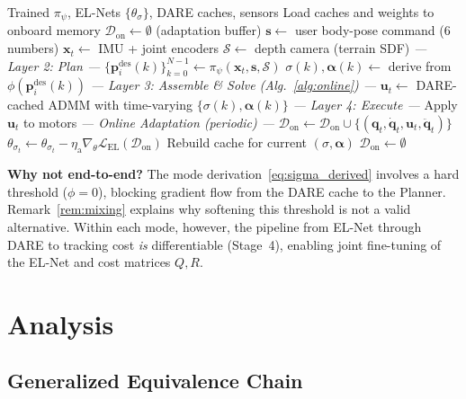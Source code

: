 \documentclass[letterpaper, 10pt, conference]{IEEEtran}
\newcommand{\balpha}{\bm{\alpha}}
\newcommand{\bx}{\bm{x}}
\newcommand{\bu}{\bm{u}}
\newcommand{\bq}{\bm{q}}
\newcommand{\bp}{\bm{p}}
\newcommand{\cS}{\mathcal{S}}
\begin{document}
\begin{algorithm}[t]
\caption{Online Deployment (Real Robot)}
\label{alg:deploy}
\begin{algorithmic}[1]
\REQUIRE Trained $\pi_\psi$, EL-Nets $\{\theta_\sigma\}$,
  DARE caches, sensors
\STATE Load caches and weights to onboard memory
\STATE $\mathcal{D}_{\mathrm{on}} \gets \emptyset$
  \hfill (adaptation buffer)
\LOOP
  \STATE $\bm{s} \gets$ user body-pose command
    \hfill (6 numbers)
  \STATE $\bx_t \gets$ IMU + joint encoders
  \STATE $\cS \gets$ depth camera
    \hfill (terrain SDF)
  \STATE \textit{--- Layer 2: Plan ---}
  \STATE $\{\bp_i^{\mathrm{des}}(k)\}_{k=0}^{N-1}
    \gets \pi_\psi(\bx_t, \bm{s}, \cS)$
    \STATE $\sigma(k), \balpha(k) \gets$
      derive from $\phi(\bp_i^{\mathrm{des}}(k))$
  \ENDFOR
  \STATE \textit{--- Layer 3: Assemble \& Solve
    (Alg.~\ref{alg:online}) ---}
  \STATE $\bu_t \gets$ DARE-cached ADMM
    with time-varying $\{\sigma(k), \balpha(k)\}$
  \STATE \textit{--- Layer 4: Execute ---}
  \STATE Apply $\bu_t$ to motors
  \STATE \textit{--- Online Adaptation (periodic) ---}
  \STATE $\mathcal{D}_{\mathrm{on}} \gets
    \mathcal{D}_{\mathrm{on}} \cup
    \{(\bq_t, \dot{\bq}_t, \bu_t, \ddot{\bq}_t)\}$
    \STATE $\theta_{\sigma_t} \gets \theta_{\sigma_t}
      - \eta_{\mathrm{a}} \nabla_\theta
      \mathcal{L}_{\mathrm{EL}}
        (\mathcal{D}_{\mathrm{on}})$
    \STATE Rebuild cache for current $(\sigma, \balpha)$
    \STATE $\mathcal{D}_{\mathrm{on}} \gets \emptyset$
  \ENDIF
\ENDLOOP
\end{algorithmic}
\end{algorithm}

\textbf{Why not end-to-end?}
The mode derivation~\eqref{eq:sigma_derived} involves a
hard threshold ($\phi = 0$), blocking gradient flow from
the DARE cache to the Planner.
Remark~\ref{rem:mixing} explains why softening this threshold
is not a valid alternative.
Within each mode, however, the pipeline from EL-Net through
DARE to tracking cost \emph{is} differentiable
(Stage~4), enabling joint fine-tuning
of the EL-Net and cost matrices $Q, R$.

\section{Analysis}\label{sec:analysis}

\subsection{Generalized Equivalence Chain}
\end{document}
